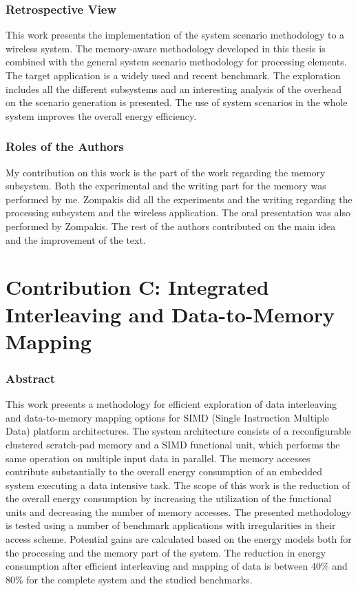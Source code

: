 \subsubsection{Retrospective View}

This work presents the implementation of the system scenario methodology to a wireless system.
The memory-aware methodology developed in this thesis is combined with the general system scenario methodology for processing elements.
The target application is a widely used and recent benchmark.
The exploration includes all the different subsystems and an interesting analysis of the overhead on the scenario generation is presented.
The use of system scenarios in the whole system improves the overall energy efficiency.

\subsubsection{Roles of the Authors}

My contribution on this work is the part of the work regarding the memory subsystem.
Both the experimental and the writing part for the memory was performed by me. 
Zompakis did all the experiments and the writing regarding the processing subsystem and the wireless application.
The oral presentation was also performed by Zompakis.
The rest of the authors contributed on the main idea and the improvement of the text.

\section{Contribution C: Integrated Interleaving and Data-to-Memory Mapping}

\subsubsection{Abstract}

This work presents a methodology for efficient exploration of data interleaving and data-to-memory mapping options for SIMD (Single Instruction Multiple Data) platform architectures.
The system architecture consists of  a reconfigurable clustered scratch-pad memory and a SIMD functional unit, which performs the same operation on multiple input data in parallel. 
The memory accesses contribute substantially to the overall energy consumption of an embedded system executing a data intensive task. 
The scope of this work is the reduction of the overall energy consumption by increasing the utilization of the functional units and decreasing the number of memory accesses.
The presented methodology is tested using a number of benchmark applications with irregularities in their access scheme.
Potential gains are calculated based on the energy models both for the processing and the memory part of the system.
The reduction in energy consumption after efficient interleaving and mapping of data is between 40\% and 80\% for the complete system and the studied benchmarks.

